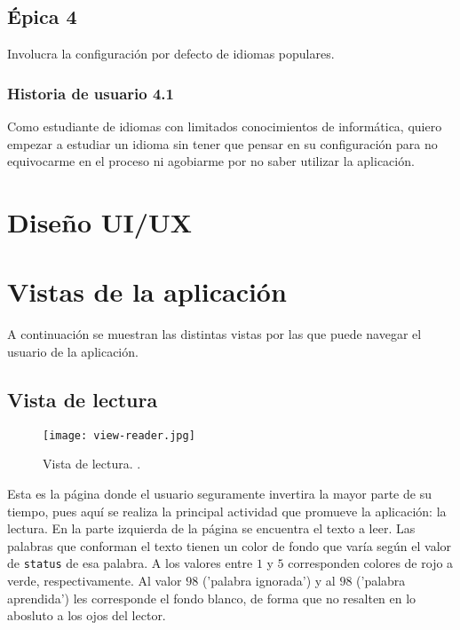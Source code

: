 \subsection{Épica 4}

Involucra la configuración por defecto de idiomas populares.

\subsubsection{Historia de usuario 4.1}

Como estudiante de idiomas con limitados conocimientos de informática, quiero empezar a estudiar un idioma sin tener que pensar en su configuración para no equivocarme en el proceso ni agobiarme por no saber utilizar la aplicación.

\section{Diseño UI/UX}

\todo

\section{Vistas de la aplicación}

A continuación se muestran las distintas vistas por las que puede navegar el usuario de la aplicación.

\subsection{Vista de lectura}

\begin{figure}[H]
	\texttt{[image: view-reader.jpg]}
	\caption[Diagrama entidad-relación]{Vista de lectura. .}
\end{figure}

Esta es la página donde el usuario seguramente invertira la mayor parte de su tiempo, pues aquí se realiza la principal actividad que promueve la aplicación: la lectura. En la parte izquierda de la página se encuentra el texto a leer. Las palabras que conforman el texto tienen un color de fondo que varía según el valor de \texttt{status} de esa palabra. A los valores entre $1$ y $5$ corresponden colores de rojo a verde, respectivamente. Al valor $98$ ('palabra ignorada') y al $98$ ('palabra aprendida') les corresponde el fondo blanco, de forma que no resalten en lo abosluto a los ojos del lector.

